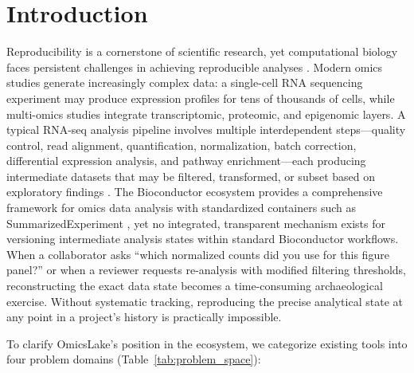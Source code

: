 \documentclass[11pt,a4paper]{article}
\begin{document}
\section{Introduction}

Reproducibility is a cornerstone of scientific research, yet computational biology faces persistent challenges in achieving reproducible analyses \citep{peng2011reproducible, sandve2013ten}. Modern omics studies generate increasingly complex data: a single-cell RNA sequencing experiment may produce expression profiles for tens of thousands of cells, while multi-omics studies integrate transcriptomic, proteomic, and epigenomic layers. A typical RNA-seq analysis pipeline involves multiple interdependent steps---quality control, read alignment, quantification, normalization, batch correction, differential expression analysis, and pathway enrichment---each producing intermediate datasets that may be filtered, transformed, or subset based on exploratory findings \citep{love2014moderated}. The Bioconductor ecosystem \citep{huber2015orchestrating, gentleman2004bioconductor} provides a comprehensive framework for omics data analysis with standardized containers such as SummarizedExperiment \citep{morgan2009summarizedexperiment}, yet no integrated, transparent mechanism exists for versioning intermediate analysis states within standard Bioconductor workflows. When a collaborator asks ``which normalized counts did you use for this figure panel?'' or when a reviewer requests re-analysis with modified filtering thresholds, reconstructing the exact data state becomes a time-consuming archaeological exercise. Without systematic tracking, reproducing the precise analytical state at any point in a project's history is practically impossible.

To clarify OmicsLake's position in the ecosystem, we categorize existing tools into four problem domains (Table~\ref{tab:problem_space}):
\end{document}
